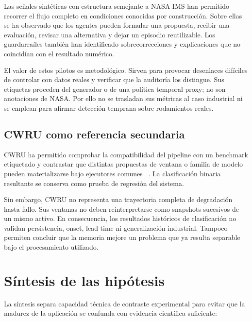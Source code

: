 Las señales sintéticas con estructura semejante a NASA IMS han permitido
recorrer el flujo completo en condiciones conocidas por construcción. Sobre
ellas se ha observado que los agentes pueden formular una propuesta, recibir
una evaluación, revisar una alternativa y dejar un episodio reutilizable. Los
guardarraíles también han identificado sobrecorrecciones y explicaciones que no
coincidían con el resultado numérico.

El valor de estos pilotos es metodológico. Sirven para provocar desenlaces
difíciles de controlar con datos reales y verificar que la auditoría los
distingue. Sus etiquetas proceden del generador o de una política temporal
proxy; no son anotaciones de NASA\@. Por ello no se trasladan sus métricas al caso
industrial ni se emplean para afirmar detección temprana sobre rodamientos
reales.

\subsection{CWRU como referencia secundaria}

CWRU ha permitido comprobar la compatibilidad del pipeline con un benchmark
etiquetado y contrastar que distintas propuestas de ventana o familia de modelo
pueden materializarse bajo ejecutores comunes
~\cite{cwru_bearing_data_center,cwru_normal_baseline,cwru_12k_drive_end}. La
clasificación binaria resultante se conserva como prueba de regresión del
sistema.

Sin embargo, CWRU no representa una trayectoria completa de degradación hasta
fallo. Sus ventanas no deben reinterpretarse como snapshots sucesivos de un
mismo activo. En consecuencia, los resultados históricos de clasificación no
validan persistencia, onset, lead time ni generalización industrial. Tampoco
permiten concluir que la memoria mejore un problema que ya resulta separable
bajo el procesamiento utilizado.

\section{Síntesis de las hipótesis}

La síntesis separa capacidad técnica de contraste experimental para evitar que
la madurez de la aplicación se confunda con evidencia científica suficiente:

